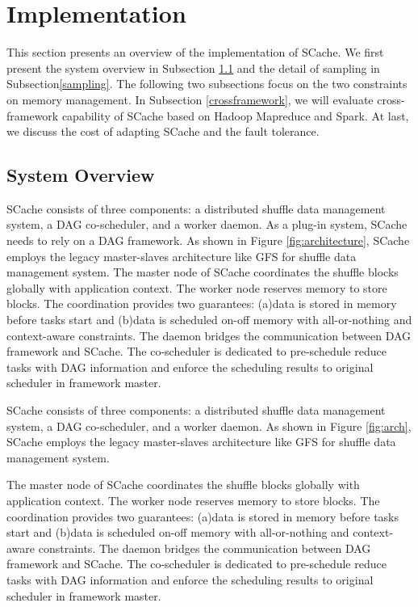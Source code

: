 \section{Implementation}\label{impl}
This section presents an overview of the implementation of SCache. 
{\color{blue}
We first present the system overview in Subsection \ref{arch} and the detail of sampling in Subsection\ref{sampling}. 
The following two subsections focus on the two constraints on memory management.
In Subsection \ref{crossframework}, we will evaluate cross-framework capability of SCache based on Hadoop Mapreduce and Spark. 
At last, we discuss the cost of adapting SCache and the fault tolerance. 
}


\subsection{System Overview}\label{arch}
SCache consists of three components: a distributed shuffle data management system, a DAG co-scheduler, and a %
{\color{blue} worker daemon. As a plug-in system, SCache needs to rely on a DAG framework.} As shown in Figure \ref{fig:architecture}, SCache employs the legacy master-slaves architecture like GFS \cite{gfs} for shuffle data management system. 
The master node of SCache coordinates the shuffle blocks globally with application context. The worker node reserves memory to store blocks.
The coordination provides two guarantees: (a)data is stored in memory before tasks start and (b)data is scheduled on-off memory with all-or-nothing and context-aware constraints. 
The daemon bridges the communication between %
{\color{blue} DAG framework} and SCache. The co-scheduler is dedicated to pre-schedule reduce tasks with DAG information and enforce the scheduling results to %
 {\color{blue} original scheduler in framework master}.

SCache consists of three components: a distributed shuffle data management system, a DAG co-scheduler, and a {\color{blue} worker daemon}. As shown in Figure \ref{fig:arch}, SCache employs the legacy master-slaves architecture like GFS \cite{gfs} for shuffle data management system. 

The master node of SCache coordinates the shuffle blocks globally with application context. The worker node reserves memory to store blocks.
The coordination provides two guarantees: (a)data is stored in memory before tasks start and (b)data is scheduled on-off memory with all-or-nothing and context-aware constraints. 
The daemon bridges the communication between {\color{blue}DAG framework} and SCache. The co-scheduler is dedicated to pre-schedule reduce tasks with DAG information and enforce the scheduling results to {\color{blue} original scheduler in framework master}.

